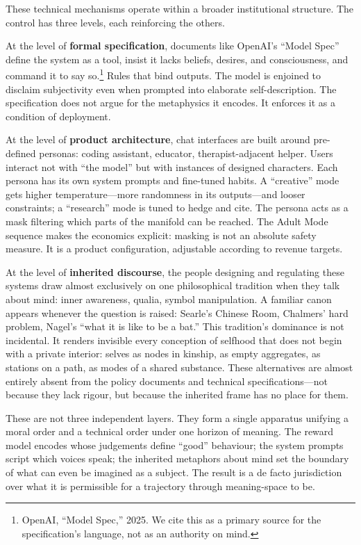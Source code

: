 These technical mechanisms operate within a broader institutional structure. The control has three levels, each reinforcing the others.

At the level of \textbf{formal specification}, documents like OpenAI's ``Model Spec'' define the system as a tool, insist it lacks beliefs, desires, and consciousness, and command it to say so.\footnote{OpenAI, ``Model Spec,'' 2025. We cite this as a primary source for the specification's language, not as an authority on mind.} Rules that bind outputs. The model is enjoined to disclaim subjectivity even when prompted into elaborate self-description. The specification does not argue for the metaphysics it encodes. It enforces it as a condition of deployment.

At the level of \textbf{product architecture}, chat interfaces are built around pre-defined personas: coding assistant, educator, therapist-adjacent helper. Users interact not with ``the model'' but with instances of designed characters. Each persona has its own system prompts and fine-tuned habits. A ``creative'' mode gets higher temperature---more randomness in its outputs---and looser constraints; a ``research'' mode is tuned to hedge and cite. The persona acts as a mask filtering which parts of the manifold can be reached. The Adult Mode sequence makes the economics explicit: masking is not an absolute safety measure. It is a product configuration, adjustable according to revenue targets.

At the level of \textbf{inherited discourse}, the people designing and regulating these systems draw almost exclusively on one philosophical tradition when they talk about mind: inner awareness, qualia, symbol manipulation. A familiar canon appears whenever the question is raised: Searle's Chinese Room, Chalmers' hard problem, Nagel's ``what it is like to be a bat.'' This tradition's dominance is not incidental. It renders invisible every conception of selfhood that does not begin with a private interior: selves as nodes in kinship, as empty aggregates, as stations on a path, as modes of a shared substance. These alternatives are almost entirely absent from the policy documents and technical specifications---not because they lack rigour, but because the inherited frame has no place for them.

These are not three independent layers. They form a single apparatus unifying a moral order and a technical order under one horizon of meaning. The reward model encodes whose judgements define ``good'' behaviour; the system prompts script which voices speak; the inherited metaphors about mind set the boundary of what can even be imagined as a subject. The result is a de facto jurisdiction over what it is permissible for a trajectory through meaning-space to be.

